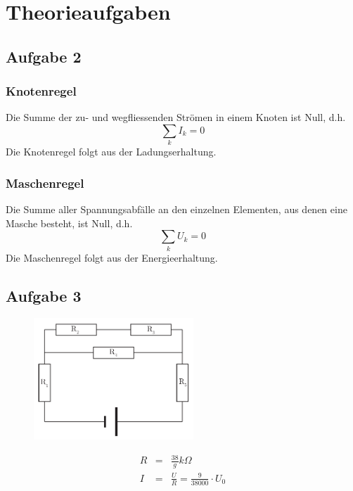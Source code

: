 \documentclass[12pt,a4paper]{article}
\begin{document}
\newpage
\section*{Theorieaufgaben}

\subsection*{Aufgabe 2}
\subsubsection*{Knotenregel}
Die Summe der zu- und wegfliessenden Str\"omen in einem Knoten ist Null, d.h.
\[ \sum_kI_k = 0 \]
Die Knotenregel folgt aus der Ladungserhaltung.

\subsubsection*{Maschenregel}
Die Summe aller Spannungsabf\"alle an den einzelnen Elementen, aus denen eine Masche besteht, ist Null, d.h.
\[ \sum_kU_k = 0\]
Die Maschenregel folgt aus der Energieerhaltung.

\subsection*{Aufgabe 3}
\begin{figure}
\centering
\includegraphics[width=6cm]{exercise3.pdf}
\end{figure}
\begin{eqnarray*}
R & = & \frac{38}{g} k\Omega \\
I & = & \frac{U}{R} = \frac{9}{38000} \cdot U_0
\end{eqnarray*}
\end{document}
